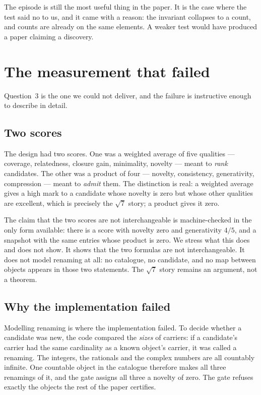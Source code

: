 \documentclass[12pt,a4paper]{article}
\begin{document}
The episode is still the most useful thing in the paper.  It is the case where the
test said no to us, and it came with a reason: the invariant collapses to a count,
and counts are already on the same elements.  A weaker test would have produced a
paper claiming a discovery.

\section{The measurement that failed}
\label{sec:failure}

Question~3 is the one we could not deliver, and the failure is instructive enough
to describe in detail.

\subsection{Two scores}

The design had two scores.  One was a weighted average of five qualities ---
coverage, relatedness, closure gain, minimality, novelty --- meant to \emph{rank}
candidates.  The other was a product of four --- novelty, consistency,
generativity, compression --- meant to \emph{admit} them.  The distinction is real:
a weighted average gives a high mark to a candidate whose novelty is zero but whose
other qualities are excellent, which is precisely the $\sqrt{7}$ story; a product
gives it zero.

The claim that the two scores are not interchangeable is machine-checked in the
only form available: there is a score with novelty zero and generativity $4/5$,
and a snapshot with the same entries whose product is zero.  We stress what this
does and does not show.  It shows that the two formulas are not interchangeable.
It does not model renaming at all: no catalogue, no candidate, and no map between
objects appears in those two statements.  The $\sqrt{7}$ story remains an
argument, not a theorem.

\subsection{Why the implementation failed}

Modelling renaming is where the implementation failed.  To decide whether a
candidate was new, the code compared the \emph{sizes} of carriers: if a
candidate's carrier had the same cardinality as a known object's carrier, it was
called a renaming.  The integers, the rationals and the complex numbers are all
countably infinite.  One countable object in the catalogue therefore makes all
three renamings of it, and the gate assigns all three a novelty of zero.  The gate
refuses exactly the objects the rest of the paper certifies.
\end{document}
